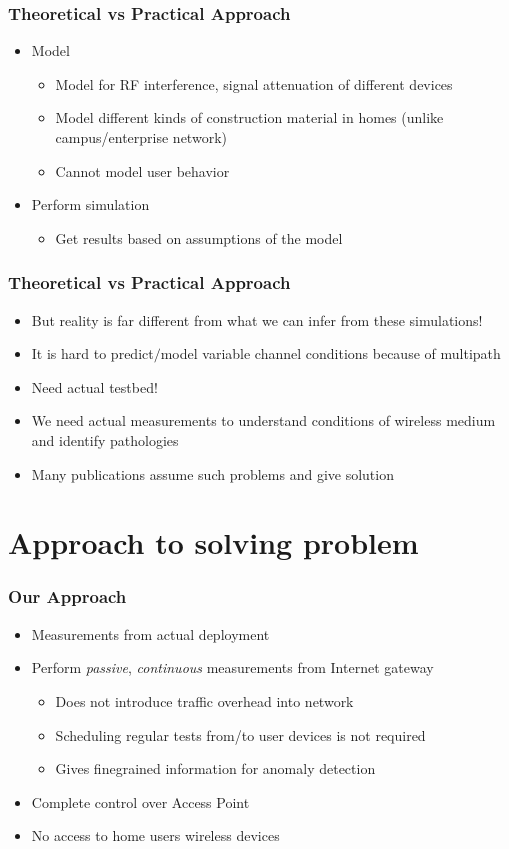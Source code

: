 \documentclass{beamer}
\begin{document}
\begin{frame}
  \frametitle{Theoretical vs Practical Approach} 
  \begin{itemize}
  \item Model
    \begin{itemize}
    \item Model for RF interference, signal attenuation of different devices
    \item Model different kinds of construction material in homes (unlike campus/enterprise network)
    \item Cannot model user behavior 
    \end{itemize}
  \item Perform simulation
    \begin{itemize}
    \item  Get results based on assumptions of the model 
    \end{itemize}
  \end{itemize}
\end{frame}

\begin{frame}
  \frametitle{Theoretical vs Practical Approach} 
    \begin{itemize} 
    \item But reality is far different from what we can infer from these simulations!
    \item It is hard to predict$/$model variable channel conditions because of multipath
    \item Need actual testbed!
    \item We need actual measurements to understand conditions of wireless medium and identify pathologies
    \item Many publications assume such problems and give solution
    \end{itemize}
\end{frame}

\section{Approach to solving problem}
\begin{frame}
  \frametitle{Our Approach} 
    \begin{itemize} 
    \item Measurements from actual deployment
    \item Perform \textit{passive}, \textit{continuous} measurements from Internet gateway
      \begin{itemize}
      \item Does not introduce traffic overhead into network
      \item Scheduling regular tests from/to user devices is not required
      \item Gives finegrained information for anomaly detection
      \end{itemize}
    \item Complete control over Access Point
    \item No access to home users wireless devices
    \end{itemize}
\end{frame}
\end{document}
